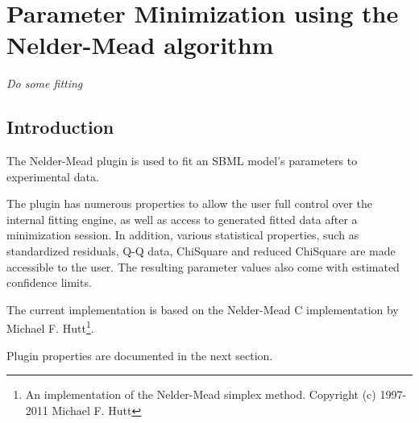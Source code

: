 \chapter*{Parameter Minimization using the Nelder-Mead algorithm}
\setcounter{chapter}{1}
\emph{Do some fitting}
\section{Introduction}
The Nelder-Mead plugin is used to fit an SBML model's parameters to experimental data.

The plugin has numerous properties to allow the user full control over the internal fitting engine, as well as
access to generated fitted data after a minimization session. In addition, various statistical properties, such as standardized residuals, Q-Q data, ChiSquare and reduced ChiSquare are made accessible to the user. The resulting parameter values also come with estimated confidence limits.

The current implementation is based on the Nelder-Mead C implementation by Michael F. Hutt\footnote{

 An implementation of the Nelder-Mead simplex method.
 Copyright (c) 1997-2011 Michael F. Hutt
}.


Plugin properties are documented in the next section.

